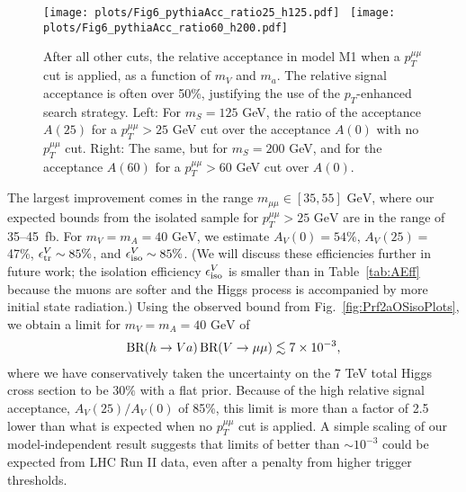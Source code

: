 \documentclass[aps,prd,twocolumn,superscriptaddress,preprintnumbers,nofootinbib,longbibliography,floatfix]{revtex4-1}
\newcommand{\ptmm}{p_T^{\mu\mu}}
\newcommand{\GeV}{\text{~GeV}}
\newcommand{\BR}{\text{BR}}
\DeclareRobustCommand{\Tab}[1]{Table~\ref{#1}}
\DeclareRobustCommand{\Fig}[1]{Fig.~\ref{#1}}
\begin{document}
%
\begin{figure*}[t]  
\begin{center}  
\leavevmode
\vskip 0.0in
\texttt{[image: plots/Fig6\_pythiaAcc\_ratio25\_h125.pdf]} \
\texttt{[image: plots/Fig6\_pythiaAcc\_ratio60\_h200.pdf]} 
\end{center}
\vskip -0.20in  
\caption{After all other cuts, the relative acceptance in model M1 when a $\ptmm$ cut is applied, as a function of $m_V$ and $m_a$.
%
The relative signal acceptance is often over 50\%, justifying the use of the $p_T$-enhanced search strategy.
%
Left: For $m_S=125$ GeV, the ratio of the acceptance $A(25)$ for a $\ptmm>25$ GeV cut over the acceptance $A(0)$ with no $\ptmm$ cut.
%
Right: The same, but for $m_S=200$ GeV, and for the acceptance $A(60)$ for a $\ptmm>60$ GeV cut over $A(0)$.}
\label{fig:M1_125ratio25_200ratio60}
\end{figure*}



The largest improvement comes in the range $m_{\mu\mu} \in [35,55] \GeV$, where our expected bounds from the isolated sample for $\ptmm>25 \GeV$ are in the range of 35--45~fb.
%
For $m_V=m_A = 40 \GeV$, we estimate  $A_V(0)=54\%$, $A_V(25)=$ 47\%, $\epsilon^V_{\rm tr}\sim 85\%$, and $\epsilon^V_{\rm iso}\sim  85\%$.
%
(We will discuss these efficiencies further in future work; the isolation efficiency $\epsilon^V_{\rm iso}$ is smaller than in \Tab{tab:AEff} because the muons are softer and the Higgs process is accompanied by more initial state radiation.)
%
Using the observed bound from \Fig{fig:Prf2aOSisoPlots}, we obtain a limit for $m_V=m_A = 40 \GeV$ of  
%
\begin{align}
  \label{eq:Brh2mumuX}
  \BR(h\to Va){\rm} \, \BR(V\to\mu\mu) \lesssim 7 \times 10^{-3},
\end{align}
%
where we have conservatively taken the uncertainty on the 7 TeV total Higgs cross section to be $30\%$ with a flat prior.
%
Because of the high relative signal acceptance, $A_V(25)/A_V(0)$ of 85\%, this limit is more than a factor of 2.5 lower than what is expected when no $\ptmm$ cut is applied.
%
A simple scaling of our model-independent result suggests that limits of better than $\sim 10^{-3}$ could be expected from LHC Run II data, even after a penalty from higher trigger thresholds. 
\end{document}
